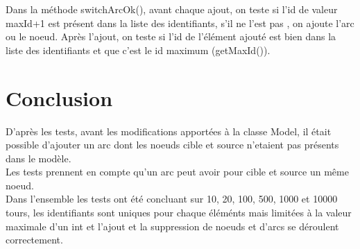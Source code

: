 \documentclass{article}
\begin{document}
Dans la m\'ethode switchArcOk(), avant chaque ajout, on teste si l'id de 
valeur maxId+1 est pr\'esent dans la liste des identifiants, s'il ne l'est pas 
, on ajoute l'arc ou le noeud.
Apr\`es l'ajout, on teste si l'id de l'\'el\'ement ajout\'e est bien 
dans la liste des identifiants et que c'est le id maximum (getMaxId()).
\\

\section{Conclusion}

D'apr\`es les tests, avant les modifications apport\'ees \`a la classe Model,
 il \'etait possible d'ajouter un arc dont les noeuds cible et source n'etaient
pas pr\'esents dans le mod\`ele.
\\

Les tests prennent en compte qu'un arc peut avoir pour cible et source un 
m\^eme noeud.
\\

Dans l'ensemble les tests ont \'et\'e concluant sur 10, 20, 100, 500, 1000 et 
10000 tours, les identifiants sont uniques pour chaque \'el\'em\'ents mais 
limit\'ees \`a la valeur maximale d'un int et l'ajout et la 
suppression de noeuds et d'arcs se d\'eroulent correctement.
\end{document}
